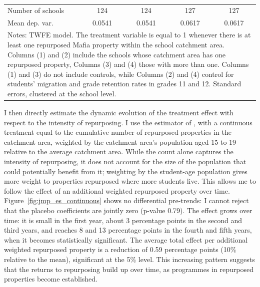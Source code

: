\documentclass[12pt]{article}
\theoremstyle{plain}
\theoremstyle{plain}
\theoremstyle{plain}
\theoremstyle{definition}
\theoremstyle{plain}
\theoremstyle{definition}
\theoremstyle{plain}
\theoremstyle{remark}
\theoremstyle{definition}
\theoremstyle{definition}
\theoremstyle{plain}
\begin{document}
\begin{table}[H]
{\begin{tabular}{p{9.355em}llll}
    \multicolumn{1}{l}{Number of schools} & \multicolumn{1}{c}{124} & \multicolumn{1}{c}{124} & \multicolumn{1}{c}{127} & \multicolumn{1}{c}{127} \\
    \multicolumn{1}{l}{Mean dep. var.} & \multicolumn{1}{c}{0.0541} & \multicolumn{1}{c}{0.0541} & \multicolumn{1}{c}{0.0617} & \multicolumn{1}{c}{0.0617} \\
    \midrule
    \multicolumn{5}{p{40.935em}}{Notes: TWFE model. The treatment variable is equal to 1 whenever there is at least one repurposed Mafia property within the school catchment area. Columns (1) and (2) include the schools whose catchment area has one repurposed property, Columns (3) and (4) those with more than one. Columns (1) and (3) do not include controls, while Columns (2) and (4) control for students' migration and grade retention rates in grades 11 and 12. Standard errors, clustered at the school level. } \\
    \end{tabular}%
    }
\end{table}


I then directly estimate the dynamic evolution of the treatment effect with respect to the intensity of repurposing. I use the estimator of \citet{de_chaisemartin_difference--differences_2024}, with a continuous treatment equal to the cumulative number of repurposed properties in the catchment area, weighted by the catchment area's population aged 15 to 19 relative to the average catchment area. While the count alone captures the intensity of repurposing, it does not account for the size of the population that could potentially benefit from it; weighting by the student-age population gives more weight to properties repurposed where more students live. This allows me to follow the effect of an additional weighted repurposed property over time. Figure~\ref{fig:jmp_es_continuous} shows no differential pre-trends: I cannot reject that the placebo coefficients are jointly zero (p-value 0.79). The effect grows over time: it is small in the first year, about 3 percentage points in the second and third years, and reaches 8 and 13 percentage points in the fourth and fifth years, when it becomes statistically significant. %
The average total effect per additional weighted repurposed property is a reduction of 0.59 percentage points (10\% relative to the mean), significant at the 5\% level. %
This increasing pattern suggests that the returns to repurposing build up over time, as programmes in repurposed properties become established. \\
\end{document}
